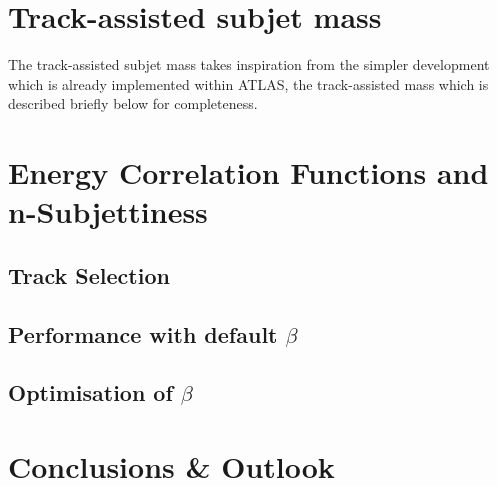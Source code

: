 \documentclass[UKenglish,texlive=2013]{\ATLASLATEXPATH atlasdoc}
\begin{document}
\section{Track-assisted subjet mass}
\label{sec:mtas}
The track-assisted subjet mass takes inspiration from the simpler development which is already implemented within ATLAS, the track-assisted mass which is described briefly below for completeness.



\section{Energy Correlation Functions and n-Subjettiness}


\subsection{Track Selection}


\subsection{Performance with default $\beta$}


\subsection{Optimisation of $\beta$}

\label{sec:ECFnS}



\section{Conclusions \& Outlook}
\label{sec:conclusions}
\end{document}

